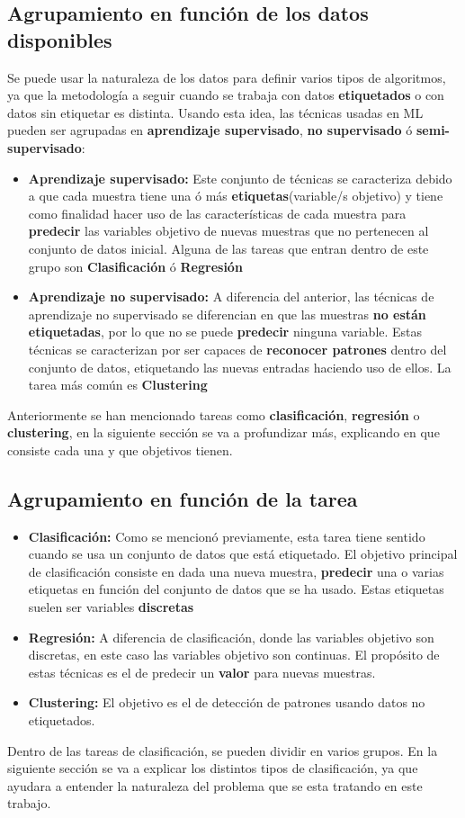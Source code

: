 \subsection{Agrupamiento en función de los datos disponibles}
Se puede usar la naturaleza de los datos para definir varios tipos de algoritmos, ya que la metodología a seguir cuando se trabaja con datos \textbf{etiquetados} o con datos sin etiquetar es distinta. Usando esta idea, las técnicas usadas en ML pueden ser agrupadas en \textbf{aprendizaje supervisado}, \textbf{no supervisado} ó \textbf{semi-supervisado}:
\begin{itemize}
	\item \textbf{Aprendizaje supervisado:} Este conjunto de técnicas se caracteriza debido a que cada muestra tiene una ó más \textbf{etiquetas}(variable/s objetivo) y tiene como finalidad hacer uso de las características de cada muestra para \textbf{predecir} las variables objetivo de nuevas muestras que no pertenecen al conjunto de datos inicial. Alguna de las tareas que entran dentro de este grupo son \textbf{Clasificación} ó \textbf{Regresión}
	\item \textbf{Aprendizaje no supervisado:} A diferencia del anterior, las técnicas de aprendizaje no supervisado se diferencian en que las muestras \textbf{no están etiquetadas}, por lo que no se puede \textbf{predecir} ninguna variable. Estas técnicas se caracterizan por ser capaces de \textbf{reconocer patrones} dentro del conjunto de datos, etiquetando las nuevas entradas haciendo uso de ellos. La tarea más común es \textbf{Clustering}
\end{itemize}
Anteriormente se han mencionado tareas como \textbf{clasificación}, \textbf{regresión} o \textbf{clustering}, en la siguiente sección se va a profundizar más, explicando en que consiste cada una y que objetivos tienen.
\subsection{Agrupamiento en función de la tarea}
\begin{itemize}
		 \item \textbf{Clasificación:} Como se mencionó previamente, esta tarea tiene sentido cuando se usa un conjunto de datos que está etiquetado. El objetivo principal de clasificación consiste en dada una nueva muestra, \textbf{predecir} una o varias etiquetas en función del conjunto de datos que se ha usado. Estas etiquetas suelen ser variables \textbf{discretas}
		 \item \textbf{Regresión:} A diferencia de clasificación, donde las variables objetivo son discretas, en este caso las variables objetivo son continuas. El propósito de estas técnicas es el de predecir un \textbf{valor} para nuevas muestras.
		 \item \textbf{Clustering:} El objetivo es el de detección de patrones usando datos no etiquetados.
\end{itemize}
Dentro de las tareas de clasificación, se pueden dividir en varios grupos. En la siguiente sección se va a explicar los distintos tipos de clasificación, ya que ayudara a entender la naturaleza del problema que se esta tratando en este trabajo.
